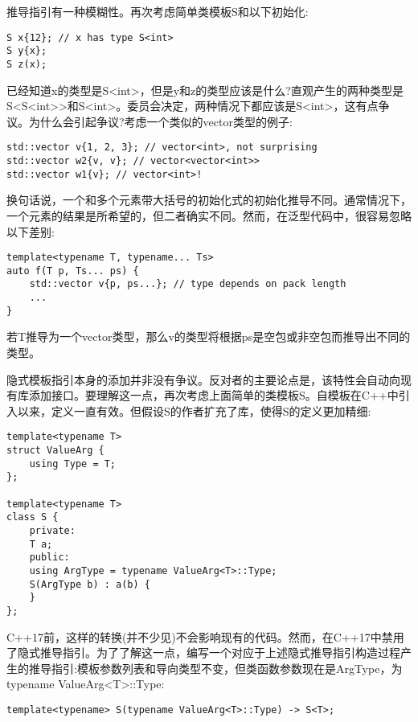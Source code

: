 推导指引有一种模糊性。再次考虑简单类模板S和以下初始化:

\begin{lstlisting}[style=styleCXX]
S x{12}; // x has type S<int>
S y{x};
S z(x);
\end{lstlisting}

已经知道x的类型是S<int>，但是y和z的类型应该是什么?直观产生的两种类型是S<S<int>{}>和S<int>。委员会决定，两种情况下都应该是S<int>，这有点争议。为什么会引起争议?考虑一个类似的vector类型的例子:

\begin{lstlisting}[style=styleCXX]
std::vector v{1, 2, 3}; // vector<int>, not surprising
std::vector w2{v, v}; // vector<vector<int>>
std::vector w1{v}; // vector<int>!
\end{lstlisting}

换句话说，一个和多个元素带大括号的初始化式的初始化推导不同。通常情况下，一个元素的结果是所希望的，但二者确实不同。然而，在泛型代码中，很容易忽略以下差别:

\begin{lstlisting}[style=styleCXX]
template<typename T, typename... Ts>
auto f(T p, Ts... ps) {
	std::vector v{p, ps...}; // type depends on pack length
	...
}
\end{lstlisting}

若T推导为一个vector类型，那么v的类型将根据ps是空包或非空包而推导出不同的类型。

隐式模板指引本身的添加并非没有争议。反对者的主要论点是，该特性会自动向现有库添加接口。要理解这一点，再次考虑上面简单的类模板S。自模板在C++中引入以来，定义一直有效。但假设S的作者扩充了库，使得S的定义更加精细:

\begin{lstlisting}[style=styleCXX]
template<typename T>
struct ValueArg {
	using Type = T;
};

template<typename T>
class S {
	private:
	T a;
	public:
	using ArgType = typename ValueArg<T>::Type;
	S(ArgType b) : a(b) {
	}
};
\end{lstlisting}

C++17前，这样的转换(并不少见)不会影响现有的代码。然而，在C++17中禁用了隐式推导指引。为了了解这一点，编写一个对应于上述隐式推导指引构造过程产生的推导指引:模板参数列表和导向类型不变，但类函数参数现在是ArgType，为typename ValueArg<T>::Type:

\begin{lstlisting}[style=styleCXX]
template<typename> S(typename ValueArg<T>::Type) -> S<T>;
\end{lstlisting}

